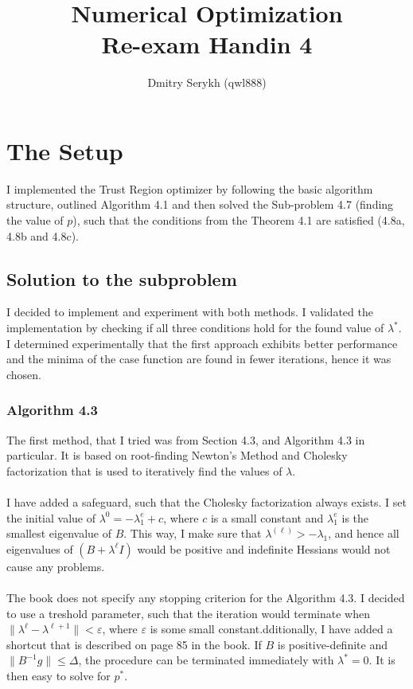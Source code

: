 \documentclass[a4paper]{article}
\title{\vspace{-5cm} Numerical Optimization \\ Re-exam Handin 4}
\author{Dmitry Serykh (qwl888)}
\begin{document}
\maketitle
\section{The Setup}
I implemented the Trust Region optimizer by following the basic algorithm
structure, outlined Algorithm 4.1 and then solved the Sub-problem 4.7 (finding
the value of $p$), such that the conditions from the Theorem 4.1 are satisfied
(4.8a, 4.8b and 4.8c).

\subsection{Solution to the subproblem}
I decided to implement and experiment with both methods. I
validated the implementation by checking if all three conditions hold for the
found value of $\lambda^*$.
I determined experimentally that the first approach exhibits better performance
and the minima of the case function are found in fewer iterations, hence it was
chosen.

\subsubsection{Algorithm 4.3}
\label{subsubsec:43}
The first method, that I tried was from Section 4.3, and
Algorithm 4.3 in particular. It is based on root-finding Newton's Method and Cholesky
factorization that is used to iteratively find the values of $\lambda$.\\\\
I have added a safeguard, such that the Cholesky factorization always exists.
I set the initial value of $\lambda^{0}= -\lambda_1^e + c$, where $c$ is a small
constant and $\lambda_1^e$ is the smallest eigenvalue of $B$. This way, I make
sure that $\lambda^{(\ell)} > -\lambda_{1}$, and hence all eigenvalues of $(B + \lambda^{\ell}I)$
would be positive and indefinite Hessians would not cause any problems.\\\\
The book does not specify any stopping criterion for the Algorithm 4.3. I
decided to use a treshold parameter, such that the iteration would
terminate when  $\| \lambda^{\ell} - \lambda^{\ell + 1} \| < \varepsilon $,
where $\varepsilon$ is some small constant.dditionally, I have added a shortcut
that is described on page 85 in the book. If $B$ is positive-definite and $\|
B^{-1}g \| \leq \Delta$, the procedure can be terminated immediately with
$\lambda^*= 0$. It is then easy to solve for $p^*$.
\end{document}
